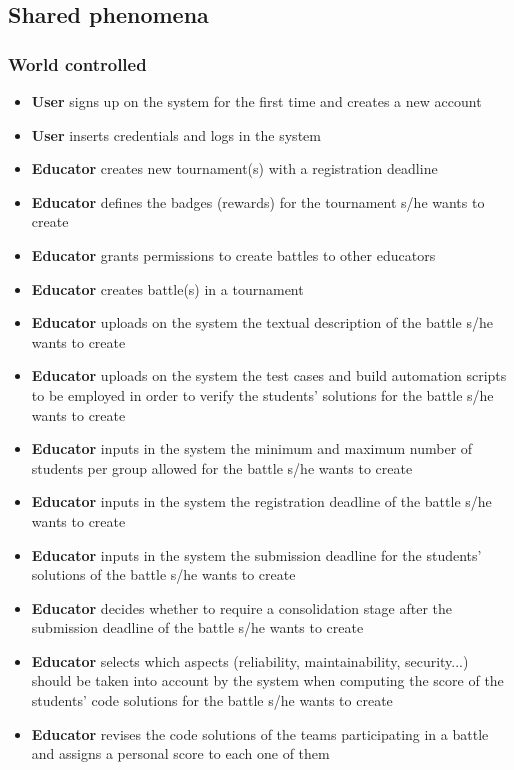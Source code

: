 	\subsection{Shared phenomena}
	
	\subsubsection{World controlled}
	
	\begin{itemize}
		\item \textbf{User} signs up on the system for the first time and creates a new account
		\item \textbf{User} inserts credentials and logs in the system
		\item \textbf{Educator} creates new tournament(s) with a registration deadline
		\item \textbf{Educator} defines the badges (rewards) for the tournament s/he wants to create
		\item \textbf{Educator} grants permissions to create battles to other educators
		\item \textbf{Educator} creates battle(s) in a tournament
		\item \textbf{Educator} uploads on the system the textual description of the battle s/he wants to create
		\item \textbf{Educator} uploads on the system the test cases and build automation scripts to be employed in order to verify the students’ solutions for the battle s/he wants to create
		\item \textbf{Educator} inputs in the system the minimum and maximum number of students per group allowed for the battle s/he wants to create
		\item \textbf{Educator} inputs in the system the registration deadline of the battle s/he wants to create
		\item \textbf{Educator} inputs in the system the submission deadline for the students’ solutions of the battle s/he wants to create
		\item \textbf{Educator} decides whether to require a consolidation stage after the submission deadline of the battle s/he wants to create
		\item \textbf{Educator} selects which aspects (reliability, maintainability, security...) should be taken into account by the system when computing the score of the students' code solutions for the battle s/he wants to create
		\item \textbf{Educator} revises the code solutions of the teams participating in a battle and assigns a personal score to each one of them

\end{itemize}
